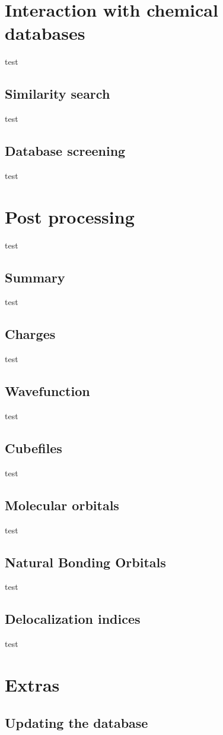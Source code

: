 \documentclass[a4paper,12pt]{assignment}
\begin{document}
\section{Interaction with chemical databases}
test
\subsection{Similarity search}
test
\subsection{Database screening}

test
\section{Post processing}
test
\subsection{Summary}
test
\subsection{Charges}
test
\subsection{Wavefunction}
test
\subsection{Cubefiles}
test
\subsection{Molecular orbitals}
test
\subsection{Natural Bonding Orbitals}
test
\subsection{Delocalization indices}
test


\section{Extras}

\subsection{Updating the database}
\end{document}
